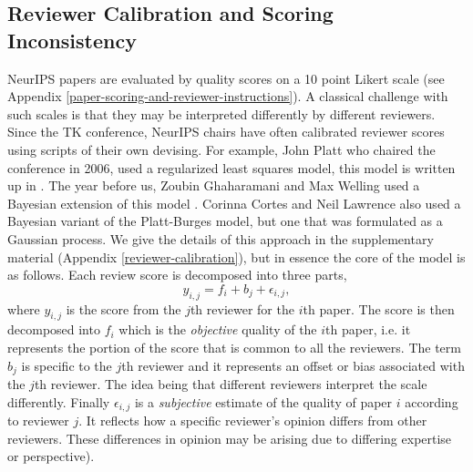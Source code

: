 \documentclass[twoside]{article}
\begin{document}
\hypertarget{reviewer-calibration-and-scoring-inconsistency}{%
\subsection{Reviewer Calibration and Scoring Inconsistency}\label{reviewer-calibration-and-scoring-inconsistency}}

NeurIPS papers are evaluated by quality scores on a 10 point Likert
scale (see Appendix \ref{paper-scoring-and-reviewer-instructions}). A
classical challenge with such scales is that they may be interpreted
differently by different reviewers. Since the TK conference, NeurIPS
chairs have often calibrated reviewer scores using scripts of their
own devising. For example, John Platt who chaired the conference in
2006, used a regularized least squares model, this model is written up
in \cite{Platt-calibration12}. The year before us, Zoubin Ghaharamani
and Max Welling used a Bayesian extension of this model
\cite{Ge-bayesian15}. Corinna Cortes and Neil Lawrence also used a
Bayesian variant of the Platt-Burges model, but one that was
formulated as a Gaussian process. We give the details of this approach
in the supplementary material (Appendix \ref{reviewer-calibration}),
but in essence the core of the model is as follows. Each review score
is decomposed into three parts,
$$
y_{i,j} = f_i + b_j + \epsilon_{i, j},
$$
where $y_{i,j}$ is the score from the $j$th reviewer for the $i$th
paper. The score is then decomposed into $f_i$ which is the
\emph{objective} quality of the $i$th paper, i.e. it represents the
portion of the score that is common to all the reviewers. The term
$b_j$ is specific to the $j$th reviewer and it represents an offset or
bias associated with the $j$th reviewer. The idea being that different
reviewers interpret the scale differently. Finally $\epsilon_{i,j}$ is
a \emph{subjective} estimate of the quality of paper $i$ according to
reviewer $j$. It reflects how a specific reviewer's opinion differs
from other reviewers. These differences in opinion may be arising due
to differing expertise or perspective).
\end{document}
